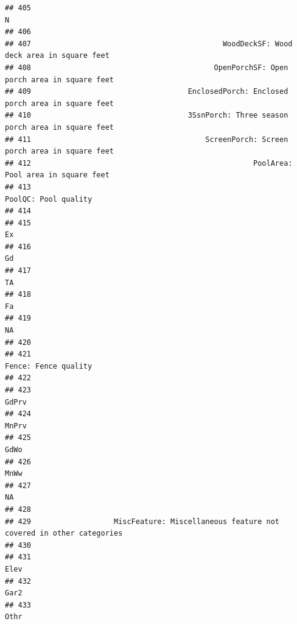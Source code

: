 \documentclass[
]{article}
\begin{document}
\begin{verbatim}
## 405                                                                                    N
## 406                                                                                     
## 407                                            WoodDeckSF: Wood deck area in square feet
## 408                                          OpenPorchSF: Open porch area in square feet
## 409                                    EnclosedPorch: Enclosed porch area in square feet
## 410                                    3SsnPorch: Three season porch area in square feet
## 411                                        ScreenPorch: Screen porch area in square feet
## 412                                                   PoolArea: Pool area in square feet
## 413                                                                 PoolQC: Pool quality
## 414                                                                                     
## 415                                                                                   Ex
## 416                                                                                   Gd
## 417                                                                                   TA
## 418                                                                                   Fa
## 419                                                                                   NA
## 420                                                                                     
## 421                                                                 Fence: Fence quality
## 422                                                                                     
## 423                                                                                GdPrv
## 424                                                                                MnPrv
## 425                                                                                 GdWo
## 426                                                                                 MnWw
## 427                                                                                   NA
## 428                                                                                     
## 429                   MiscFeature: Miscellaneous feature not covered in other categories
## 430                                                                                     
## 431                                                                                 Elev
## 432                                                                                 Gar2
## 433                                                                                 Othr

\end{verbatim}
\end{document}
